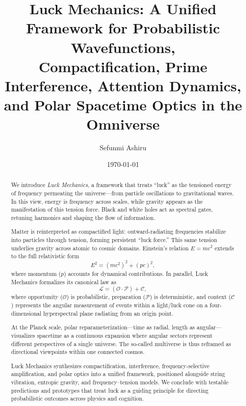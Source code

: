 \documentclass[12pt]{article}
\title{Luck Mechanics: A Unified Framework for Probabilistic Wavefunctions,\\
Compactification, Prime Interference, Attention Dynamics, and Polar Spacetime Optics in the Omniverse}
\author{Sefunmi Ashiru}
\date{\today}
\newcommand{\Luck}{\mathcal{L}}
\newcommand{\Opp}{\mathcal{O}}
\newcommand{\Prep}{\mathcal{P}}
\newcommand{\Circ}{\mathcal{C}}
\theoremstyle{plain}
\theoremstyle{definition}
\begin{document}
\maketitle

\begin{abstract}
  We introduce \emph{Luck Mechanics}, a framework that treats ``luck'' as the tensioned energy of frequency permeating the universe—from particle oscillations to gravitational waves. In this view, energy is frequency across scales, while gravity appears as the manifestation of this tension force. Black and white holes act as spectral gates, retuning harmonics and shaping the flow of information.  
  
  Matter is reinterpreted as compactified light: outward-radiating frequencies stabilize into particles through tension, forming persistent ``luck force.'' This same tension underlies gravity across atomic to cosmic domains. Einstein’s relation \(E=mc^2\) extends to the full relativistic form
  \[
  E^2 = (mc^2)^2 + (pc)^2,
  \]
  where momentum (\(p\)) accounts for dynamical contributions. In parallel, Luck Mechanics formalizes its canonical law as
  \[
  \Luck = (\Opp \cdot \Prep) + \Circ,
  \]
  where opportunity (\(\Opp\)) is probabilistic, preparation (\(\Prep\)) is deterministic, and context (\(\Circ\)) represents the angular measurement of events within a light/luck cone on a four-dimensional hyperspectral plane radiating from an origin point.  
  
  At the Planck scale, polar reparameterization—time as radial, length as angular—visualizes spacetime as a continuous expansion where angular sectors represent different perspectives of a single universe. The so-called multiverse is thus reframed as directional viewpoints within one connected cosmos.  
  
  Luck Mechanics synthesizes compactification, interference, frequency-selective amplification, and polar optics into a unified framework, positioned alongside string vibration, entropic gravity, and frequency–tension models. We conclude with testable predictions and prototypes that treat luck as a guiding principle for directing probabilistic outcomes across physics and cognition.
\end{abstract}

\tableofcontents
\newpage
\end{document}
